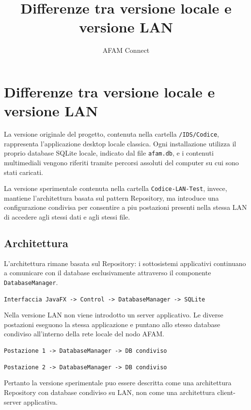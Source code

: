 \documentclass[a4paper,12pt]{article}
\title{Differenze tra versione locale e versione LAN}
\author{AFAM Connect}
\date{}
\begin{document}
\maketitle

\section{Differenze tra versione locale e versione LAN}

La versione originale del progetto, contenuta nella cartella \texttt{/IDS/Codice},
rappresenta l'applicazione desktop locale classica. Ogni installazione utilizza il
proprio database SQLite locale, indicato dal file \texttt{afam.db}, e i contenuti
multimediali vengono riferiti tramite percorsi assoluti del computer su cui sono
stati caricati.

La versione sperimentale contenuta nella cartella \texttt{Codice-LAN-Test}, invece,
mantiene l'architettura basata sul pattern Repository, ma introduce una
configurazione condivisa per consentire a piu postazioni presenti nella stessa LAN
di accedere agli stessi dati e agli stessi file.

\subsection{Architettura}

L'architettura rimane basata sul Repository: i sottosistemi applicativi continuano
a comunicare con il database esclusivamente attraverso il componente
\texttt{DatabaseManager}.

\begin{center}
\texttt{Interfaccia JavaFX -> Control -> DatabaseManager -> SQLite}
\end{center}

Nella versione LAN non viene introdotto un server applicativo. Le diverse
postazioni eseguono la stessa applicazione e puntano allo stesso database
condiviso all'interno della rete locale del nodo AFAM.

\begin{center}
\texttt{Postazione 1 -> DatabaseManager -> DB condiviso}

\texttt{Postazione 2 -> DatabaseManager -> DB condiviso}
\end{center}

Pertanto la versione sperimentale puo essere descritta come una architettura
Repository con database condiviso su LAN, non come una architettura client-server
applicativa.
\end{document}
